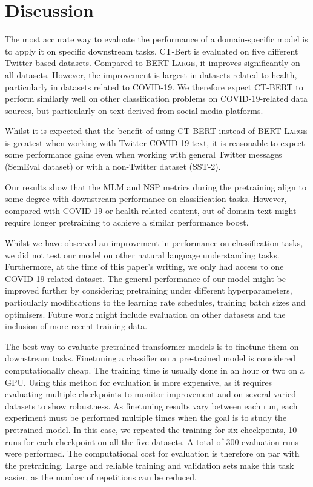 \documentclass{article}
\begin{document}
\section{Discussion}
\label{sec:discussion}

The most accurate way to evaluate the performance of a domain-specific model is to apply it on specific downstream tasks.
CT-Bert is evaluated on five different Twitter-based datasets.
Compared to \textsc{BERT-Large}, it improves significantly on all datasets.
However, the improvement is largest in datasets related to health, particularly in datasets related to COVID-19.
We therefore expect \textsc{CT-BERT} to perform similarly well on other classification problems on COVID-19-related data sources, but particularly on text derived from social media platforms.

Whilst it is expected that the benefit of using \textsc{CT-BERT} instead of \textsc{BERT-Large} is greatest when working with Twitter COVID-19 text, it is reasonable to expect some performance gains even when working with general Twitter messages (SemEval dataset) or with a non-Twitter dataset (SST-2).

Our results show that the MLM and NSP metrics during the pretraining align to some degree with downstream performance on classification tasks.
However, compared with COVID-19 or health-related content, out-of-domain text might require longer pretraining to achieve a similar performance boost.

Whilst we have observed an improvement in performance on classification tasks, we did not test our model on other natural language understanding tasks.
Furthermore, at the time of this paper’s writing, we only had access to one COVID-19-related dataset.
The general performance of our model might be improved further by considering pretraining under different hyperparameters, particularly modifications to the learning rate schedules, training batch sizes and optimisers.
Future work might include evaluation on other datasets and the inclusion of more recent training data.

The best way to evaluate pretrained transformer models is to finetune them on downstream tasks.
Finetuning a classifier on a pre-trained model is considered computationally cheap.
The training time is usually done in an hour or two on a GPU.
Using this method for evaluation is more expensive, as it requires evaluating multiple checkpoints to monitor improvement and on several varied datasets to show robustness.
As finetuning results vary between each run, each experiment must be performed multiple times when the goal is to study the pretrained model.
In this case, we repeated the training for six checkpoints, 10 runs for each checkpoint on all the five datasets.
A total of 300 evaluation runs were performed.
The computational cost for evaluation is therefore on par with the pretraining.
Large and reliable training and validation sets make this task easier, as the number of repetitions can be reduced.
\end{document}
